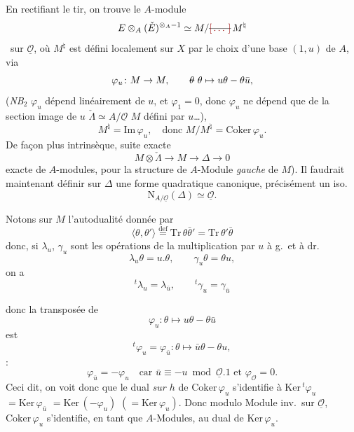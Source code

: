 \documentclass[11pt,a4paper]{article}
\begin{document}
En rectifiant le tir, on trouve le $A$-module
\[
  E \otimes_A (\check{E})^{\otimes_A -1} \simeq M/\text{\struck{\ill{}}}\,M^{\natural}
\]
  \ sur $\underline{\mathcal{O}}$, où $M^{\natural}$ est défini localement sur $X$ par le choix d'une base $(1, u)$ de $A$, via
\[
  \varphi_u \colon M \to M, \qquad \text{\struck{$\theta$}}\ \theta \mapsto u\theta - \theta\bar{u},
\]
(\emph{NB}\({}_2\) $\varphi_u$ dépend linéairement de $u$, et $\varphi_1 = 0$, donc  $\varphi_u$ ne dépend que de la section image de $u$  $\check{\Lambda} \simeq A/\underline{\mathcal{O}}$ \ill{} $M$ défini par $u$…), \struck{\ill{}} 
\[
  M^{\natural} = \mathrm{Im}\, \varphi_u, \quad \text{donc } M/M^{\natural} = \mathrm{Coker}\, \varphi_u .
\]
De façon plus intrinsèque, \ill{} suite exacte
\[
  M \otimes \check{\Lambda} \to M \to \Delta \to 0
\]
 exacte de $A$-modules, pour la structure de $A$-Module \emph{gauche} de $M$). Il faudrait maintenant définir sur $\Delta$ une forme quadratique  canonique,  précisément un iso.
\[
  \mathrm{N}_{A/\underline{\mathcal{O}}}(\Delta) \simeq \underline{\mathcal{O}} .
\]

Notons sur $M$ l'autodualité donnée par
\[
  \langle \theta, \theta' \rangle \overset{\mathrm{def}}{=} \mathrm{Tr}\, \theta\bar{\theta}' = \mathrm{Tr}\, \theta'\bar{\theta}
\]
donc, si $\lambda_u$, $\gamma_u$ sont les opérations de la multiplication par $u$ à g.\ et à dr.
\[
  \lambda_u \theta = u.\theta, \qquad \gamma_u \theta = \theta u,
\]
on a
\[
  {}^{t}\lambda_u = \lambda_{\bar{u}}, \qquad {}^{t}\gamma_u = \gamma_{\bar{u}}
\]

donc la transposée de \struck{\ill{}}
\[
  \varphi_u \colon \theta \mapsto u\theta - \theta\bar{u}
\]
est
\[
  {}^{t}\varphi_u = \varphi_{\bar{u}} \colon \theta \mapsto \bar{u}\theta - \theta u ,
\]
 :
\[
  \varphi_{\bar{u}} = -\varphi_u \quad \text{car } \bar{u} \equiv -u \bmod \underline{\mathcal{O}}.1 \text{ et } \varphi_{\mathcal{O}} = 0 .
\]
Ceci dit, on voit donc que le dual \emph{sur $h$} de $\mathrm{Coker}\, \varphi_u$ s'identifie à $\mathrm{Ker}\, {}^{t}\varphi_u$ $= \mathrm{Ker}\, \varphi_{\bar{u}}$ $= \mathrm{Ker}\, (-\varphi_u)$ $(= \mathrm{Ker}\, \varphi_u)$. Donc modulo Module inv.\ sur $\underline{\mathcal{O}}$, $\mathrm{Coker}\, \varphi_u$ s'identifie, en tant que $A$-Modules, au dual  de $\mathrm{Ker}\, \varphi_u$.
\end{document}
